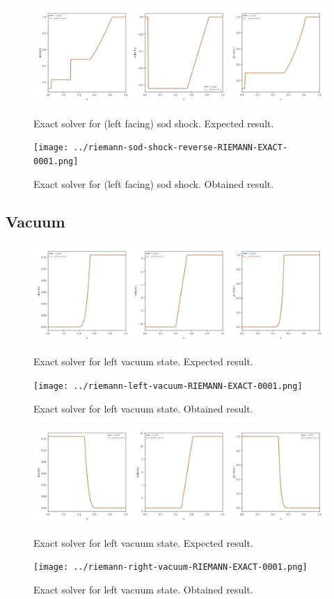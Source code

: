     \begin{figure}[htbp]
        \centering
        \includegraphics[width=.9\textwidth]{./figures/riemann-sod-shock-reverse-RIEMANN-EXACT-overplotted.png}%
        \caption{Exact solver for (left facing) sod shock. Expected result.}
        \texttt{[image: ../riemann-sod-shock-reverse-RIEMANN-EXACT-0001.png]}%
        \caption{Exact solver for (left facing) sod shock. Obtained result.}
    \end{figure}












\clearpage
\subsection{Vacuum}


    \begin{figure}[htbp]
        \centering
        \includegraphics[width=.9\textwidth]{./figures/riemann-left-vacuum-RIEMANN-EXACT-overplotted.png}%
        \caption{Exact solver for left vacuum state. Expected result.}
        \texttt{[image: ../riemann-left-vacuum-RIEMANN-EXACT-0001.png]}
        \caption{Exact solver for left vacuum state. Obtained result.}
    \end{figure}


    \begin{figure}[htbp]
        \centering
        \includegraphics[width=.9\textwidth]{./figures/riemann-right-vacuum-RIEMANN-EXACT-overplotted.png}%
        \caption{Exact solver for left vacuum state. Expected result.}
        \texttt{[image: ../riemann-right-vacuum-RIEMANN-EXACT-0001.png]}
        \caption{Exact solver for left vacuum state. Obtained result.}
    \end{figure}


